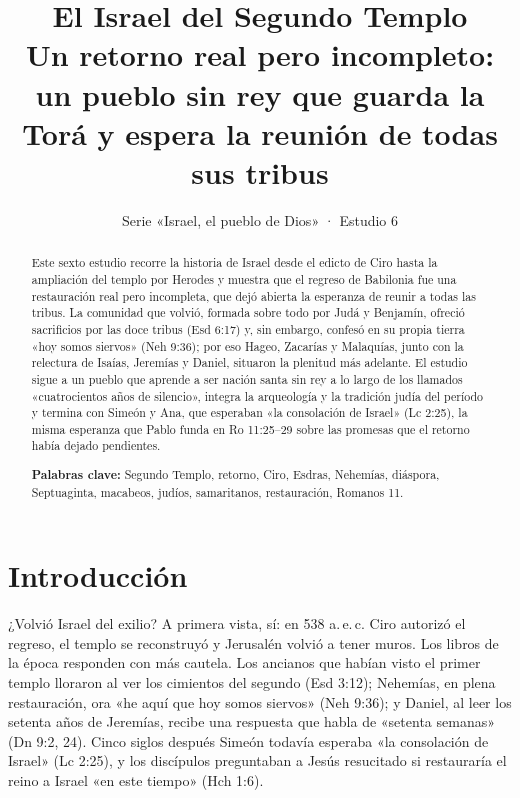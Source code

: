 \title{\color{ladrillo}\bfseries El Israel del Segundo Templo\\[4pt]\large\color{cafe}\mdseries Un retorno real pero incompleto: un pueblo sin rey que guarda la Torá y espera la reunión de todas sus tribus}
\author{}\date{\color{sepia}Serie «Israel, el pueblo de Dios» · Estudio 6}

\maketitle\thispagestyle{empty}

\begin{abstract}\noindent
Este sexto estudio recorre la historia de Israel desde el edicto de Ciro hasta la ampliación del templo por Herodes y muestra que el regreso de Babilonia fue una restauración real pero incompleta, que dejó abierta la esperanza de reunir a todas las tribus. La comunidad que volvió, formada sobre todo por Judá y Benjamín, ofreció sacrificios por las doce tribus (Esd 6:17) y, sin embargo, confesó en su propia tierra «hoy somos siervos» (Neh 9:36); por eso Hageo, Zacarías y Malaquías, junto con la relectura de Isaías, Jeremías y Daniel, situaron la plenitud más adelante. El estudio sigue a un pueblo que aprende a ser nación santa sin rey a lo largo de los llamados «cuatrocientos años de silencio», integra la arqueología y la tradición judía del período y termina con Simeón y Ana, que esperaban «la consolación de Israel» (Lc 2:25), la misma esperanza que Pablo funda en Ro 11:25--29 sobre las promesas que el retorno había dejado pendientes.
\par\smallskip\noindent\textbf{Palabras clave:} Segundo Templo, retorno, Ciro, Esdras, Nehemías, diáspora, Septuaginta, macabeos, judíos, samaritanos, restauración, Romanos 11.
\end{abstract}

\section{Introducción}

¿Volvió Israel del exilio? A primera vista, sí: en 538 a.\,e.\,c. Ciro autorizó el regreso, el templo se reconstruyó y Jerusalén volvió a tener muros. Los libros de la época responden con más cautela. Los ancianos que habían visto el primer templo lloraron al ver los cimientos del segundo (Esd 3:12); Nehemías, en plena restauración, ora «he aquí que hoy somos siervos» (Neh 9:36); y Daniel, al leer los setenta años de Jeremías, recibe una respuesta que habla de «setenta semanas» (Dn 9:2, 24). Cinco siglos después Simeón todavía esperaba «la consolación de Israel» (Lc 2:25), y los discípulos preguntaban a Jesús resucitado si restauraría el reino a Israel «en este tiempo» (Hch 1:6).

